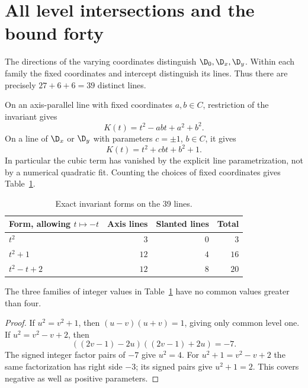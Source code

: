 \section{All level intersections and the bound forty}\label{sec:levels}

The directions of the varying coordinates distinguish
$\D_0,\D_x,\D_y$. Within each family the fixed coordinates
and intercept distinguish its lines. Thus there are precisely
$27+6+6=39$ distinct lines.

On an axis-parallel line with fixed coordinates $a,b\in C$,
restriction of the invariant gives
\begin{equation}\label{eq:axisform}
 K(t)=t^2-abt+a^2+b^2.
\end{equation}
On a line of $\D_x$ or $\D_y$ with parameters $c=\pm1$,
$b\in C$, it gives
\begin{equation}\label{eq:slantform}
 K(t)=t^2+cbt+b^2+1.
\end{equation}
In particular the cubic term has vanished by the explicit
line parametrization, not by a numerical quadratic fit.
Counting the choices of fixed coordinates gives
Table~\ref{tab:forms}.

\begin{table}[tb]
\centering
\begin{tabular}{@{}lrrr@{}}
\toprule
Form, allowing $t\mapsto-t$ & Axis lines & Slanted lines & Total\\
\midrule
$t^2$ & $3$ & $0$ & $3$\\
$t^2+1$ & $12$ & $4$ & $16$\\
$t^2-t+2$ & $12$ & $8$ & $20$\\
\bottomrule
\end{tabular}
\caption{Exact invariant forms on the 39 lines.}
\label{tab:forms}
\end{table}

\begin{lemma}\label{lem:leveloverlap}
The three families of integer values in Table~\ref{tab:forms}
have no common values greater than four.
\end{lemma}

\begin{proof}
If $u^2=v^2+1$, then $(u-v)(u+v)=1$, giving only common
level one. If $u^2=v^2-v+2$, then
\[
 ((2v-1)-2u)((2v-1)+2u)=-7.
\]
The signed integer factor pairs of $-7$ give $u^2=4$.
For $u^2+1=v^2-v+2$ the same factorization has right
side $-3$; its signed pairs give $u^2+1=2$.
This covers negative as well as positive parameters.
\end{proof}

